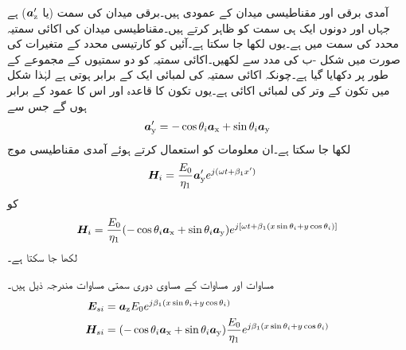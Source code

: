 آمدی برقی اور مقناطیسی میدان  کے عمودی ہیں۔برقی میدان کی سمت  (یا ${\boldsymbol{a}}_{\textup{z}}'$) ہے جہاں  اور  دونوں ایک ہی سمت کو ظاہر کرتے ہیں۔مقناطیسی میدان   کی اکائی سمتیہ  محدد   کی سمت میں ہے۔یوں   لکھا جا سکتا ہے۔آئیں  کو کارتیسی محدد  کے متغیرات کی صورت میں شکل -ب کی مدد سے لکھیں۔اکائی سمتیہ  کو دو سمتیوں کے مجموعے کے طور پر دکھایا گیا ہے۔چونکہ اکائی سمتیہ کی لمبائی ایک کے برابر ہوتی ہے لہٰذا شکل میں تکون کے وتر کی لمبائی اکائی ہے۔یوں  تکون کا قاعدہ  اور اس کا عمود  کے برابر ہوں گے جس سے
\begin{align}\label{مساوات_ترچھی_اکائی_وائے_ڈیش}
{\boldsymbol{a}}_{\textup{y}}'=-\cos \theta_i {\boldsymbol{a}}_{\textup{x}}+\sin \theta_i {\boldsymbol{a}}_{\textup{y}}
\end{align} 
لکھا جا سکتا ہے۔ان معلومات کو استعمال کرتے ہوئے آمدی مقناطیسی موج
\begin{align*}
{\ensuremath{{\boldsymbol{H}}}}_i&=\frac{E_0}{\eta_1} {\boldsymbol{a}}_{\textup{y}}' e^{j(\omega t +\beta_1 x')}
\end{align*}
کو
\begin{align}\label{مساوات_ترچھی_عمودی_برقی_میں_مقناطیسی_آمدی}
{\ensuremath{{\boldsymbol{H}}}}_i=\frac{E_0}{\eta_1} (-\cos \theta_i {\boldsymbol{a}}_{\textup{x}}+\sin \theta_i {\boldsymbol{a}}_{\textup{y}}) e^{j[\omega t +\beta_1 (x\sin \theta_i +y \cos \theta_i)]}
\end{align}
لکھا جا سکتا ہے۔

مساوات  اور مساوات  کے مساوی دوری سمتی مساوات مندرجہ ذیل ہیں۔
\begin{align}
{\ensuremath{{\boldsymbol{E}}}}_{si} & = {\boldsymbol{a}}_{\textup{z}} E_0 e^{j\beta_1 (x\sin \theta_i +y \cos \theta_i)} \label{مساوات_ترچھی_آمدی_برقی_میدان_دوری_سمتی}\\
{{\boldsymbol{H}}}_{si} & = (-\cos \theta_i {\boldsymbol{a}}_{\textup{x}}+\sin \theta_i {\boldsymbol{a}}_{\textup{y}})\frac{E_0}{\eta_1} e^{j\beta_1 (x\sin \theta_i +y \cos \theta_i)} \label{مساوات_ترچھی_آمدی_مقناطیسی_میدان_دوری_سمتی}
\end{align}

